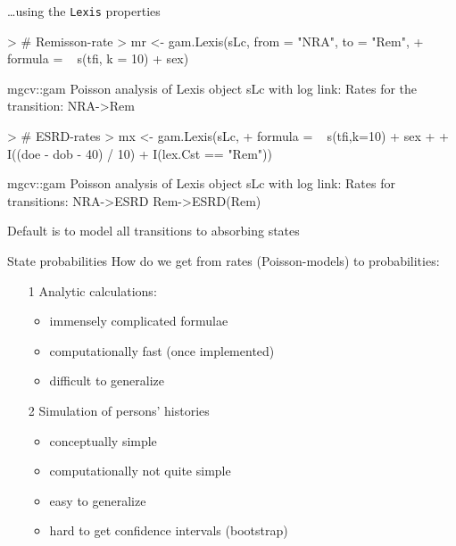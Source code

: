 \begin{frame}[fragile]{\ldots using the \texttt{Lexis} properties}
\vspace*{-1em}
\begin{Schunk}
\begin{Sinput}
> # Remisson-rate
> mr <- gam.Lexis(sLc, from = "NRA", to = "Rem",
+                 formula = ~ s(tfi, k = 10) + sex)
\end{Sinput}
\begin{Soutput}
mgcv::gam Poisson analysis of Lexis object sLc with log link:
Rates for the transition:
NRA->Rem
\end{Soutput}
\begin{Sinput}
> # ESRD-rates
> mx <- gam.Lexis(sLc,
+                 formula = ~ s(tfi,k=10) + sex +
+                             I((doe - dob - 40) / 10) + I(lex.Cst == "Rem"))
\end{Sinput}
\begin{Soutput}
mgcv::gam Poisson analysis of Lexis object sLc with log link:
Rates for transitions:
NRA->ESRD
Rem->ESRD(Rem)
\end{Soutput}
\end{Schunk}
\vspace*{-1em}
Default is to model all transitions to absorbing states
\end{frame}

\begin{frame}{State probabilities}
   How do we get from rates (Poisson-models) to probabilities:
\pause
   \begin{itemize}[<+->]
   \item[1] Analytic calculations:

 \begin{itemize}[<+->]
     \item immensely complicated formulae
     \item computationally fast (once implemented)
     \item difficult to generalize
     \end{itemize}

   \item[2] Simulation of persons' histories

     \begin{itemize}[<+->]
     \item conceptually simple
     \item computationally not quite simple
     \item easy to generalize
     \item hard to get confidence intervals (bootstrap)
     \end{itemize}

   \end{itemize}
\end{frame}

